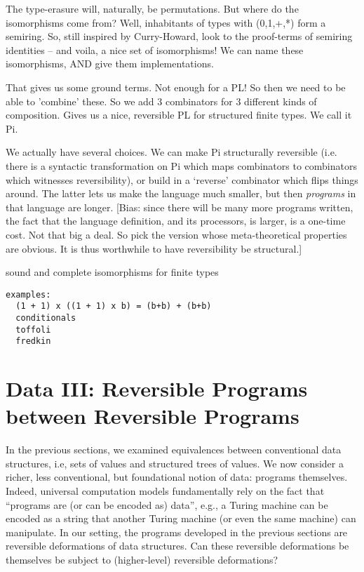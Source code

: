 \documentclass{article}
\begin{document}
The type-erasure will, naturally, be permutations. But where do the
isomorphisms come from?  Well, inhabitants of types with (0,1,+,*)
form a semiring. So, still inspired by Curry-Howard, look to the
proof-terms of semiring identities -- and voila, a nice set of
isomorphisms! We can name these isomorphisms, AND give them
implementations. 

That gives us some ground terms.  Not enough for a PL! So then
we need to be able to 'combine' these. So we add 3 combinators for
3 different kinds of composition.
Gives us a nice, reversible PL for
structured finite types. We call it Pi.

We actually have several choices. We can make Pi structurally reversible
(i.e. there is a syntactic transformation on Pi which maps combinators
to combinators which witnesses reversibility), or build in a `reverse'
combinator which flips things around. The latter lets us make the
language much smaller, but then \emph{programs} in that language are longer.
[Bias: since there will be many more programs written, the fact that the
language definition, and its processors, is larger, is a one-time cost.
Not that big a deal. So pick the version whose meta-theoretical
properties are obvious. It is thus worthwhile to have reversibility be
structural.]

sound and complete isomorphisms for finite types

\begin{verbatim}
examples: 
  (1 + 1) x ((1 + 1) x b) = (b+b) + (b+b)
  conditionals
  toffoli
  fredkin
\end{verbatim}

\section{Data III: Reversible Programs between Reversible Programs}

In the previous sections, we examined equivalences between
conventional data structures, i.e, sets of values and structured trees
of values. We now consider a richer, less conventional, but
foundational notion of data: programs themselves. Indeed, universal
computation models fundamentally rely on the fact that ``programs are
(or can be encoded as) data'', e.g., a Turing machine can be encoded
as a string that another Turing machine (or even the same machine) can
manipulate. In our setting, the programs developed in the previous
sections are reversible deformations of data structures. Can these
reversible deformations be themselves be subject to (higher-level)
reversible deformations? 
\end{document}

